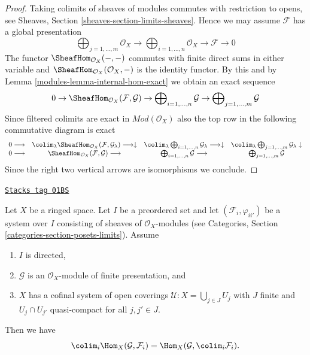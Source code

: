 \begin{proof}

Taking colimits of sheaves of modules commutes with restriction to opens, see
Sheaves, Section \ref{sheaves-section-limits-sheaves}. Hence we may assume
$\mathcal{F}$ has a global presentation
$$
\bigoplus\nolimits_{j = 1, \ldots, m}
\mathcal{O}_X
\longrightarrow
\bigoplus\nolimits_{i = 1, \ldots, n}
\mathcal{O}_X
\to
\mathcal{F}
\to
0
$$
The functor $\SheafHom_{\mathcal{O}_X}(-, -)$ commutes with finite direct sums
in either variable and $\SheafHom_{\mathcal{O}_X}(\mathcal{O}_X, -)$
is the identity functor. By this and by Lemma \ref{modules-lemma-internal-hom-exact}
we obtain an exact sequence
$$
0 \to
\SheafHom_{\mathcal{O}_X}(\mathcal{F}, \mathcal{G}) \to
\bigoplus\nolimits_{i = 1, \ldots, n} \mathcal{G} \to
\bigoplus\nolimits_{j = 1, \ldots, m} \mathcal{G}
$$
Since filtered colimits are exact in $\textit{Mod}(\mathcal{O}_X)$
also the top row in the following commutative diagram is exact
$$
\begin{array}{cccc}0 \longrightarrow & \colim_\lambda \SheafHom_{\mathcal{O}_X}(\mathcal{F}, \mathcal{G}_\lambda)
\longrightarrow\downarrow & \colim_\lambda \bigoplus\nolimits_{i = 1, \ldots, n} \mathcal{G}_\lambda
\longrightarrow\downarrow & \colim_\lambda \bigoplus\nolimits_{j = 1, \ldots, m} \mathcal{G}_\lambda
\downarrow \\ 0 \longrightarrow & \SheafHom_{\mathcal{O}_X}(\mathcal{F}, \mathcal{G}) \longrightarrow & \bigoplus\nolimits_{i = 1, \ldots, n} \mathcal{G} \longrightarrow & \bigoplus\nolimits_{j = 1, \ldots, m} \mathcal{G}\end{array}
$$
Since the right two vertical arrows are isomorphisms we conclude.
\end{proof}

\begin{lemma}
\label{modules-lemma-finite-presentation-quasi-compact-colimit}
\href{https://stacks.math.columbia.edu/tag/01BS}{\texttt{Stacks tag 01BS}}

Let $X$ be a ringed space.
Let $I$ be a preordered set and
let $(\mathcal{F}_i, \varphi_{ii'})$ be a system over $I$
consisting of sheaves of $\mathcal{O}_X$-modules
(see Categories, Section \ref{categories-section-posets-limits}).
Assume
\begin{enumerate}
\item $I$ is directed,
\item $\mathcal{G}$ is an $\mathcal{O}_X$-module of finite presentation, and
\item $X$ has a cofinal system of open coverings
$\mathcal{U} : X = \bigcup_{j\in J} U_j$ with
$J$ finite and $U_j \cap U_{j'}$ quasi-compact
for all $j, j' \in J$.
\end{enumerate}
Then we have
$$
\colim_i \Hom_X(\mathcal{G}, \mathcal{F}_i)
=
\Hom_X(\mathcal{G}, \colim_i \mathcal{F}_i).
$$
\end{lemma}

